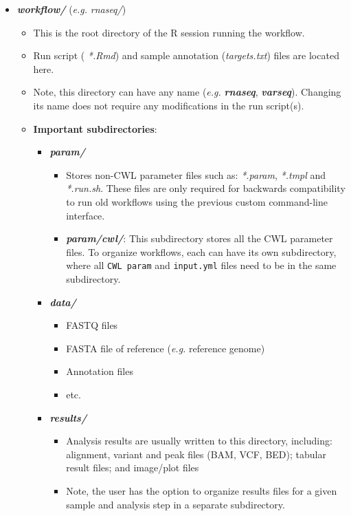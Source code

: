 \documentclass[14pt,]{article}
\providecommand{\tightlist}{%
  \setlength{\itemsep}{0pt}\setlength{\parskip}{0pt}}
\begin{document}
\begin{itemize}
\tightlist
\item
  {\emph{\textbf{workflow/}}} (\emph{e.g.} \emph{rnaseq/})

  \begin{itemize}
  \tightlist
  \item
    This is the root directory of the R session running the workflow.
  \item
    Run script ( \emph{*.Rmd}) and sample annotation (\emph{targets.txt}) files are located here.
  \item
    Note, this directory can have any name (\emph{e.g.} {\emph{\textbf{rnaseq}}}, {\emph{\textbf{varseq}}}). Changing its name does not require any modifications in the run script(s).
  \item
    \textbf{Important subdirectories}:

    \begin{itemize}
    \tightlist
    \item
      {\emph{\textbf{param/}}}

      \begin{itemize}
      \tightlist
      \item
        Stores non-CWL parameter files such as: \emph{*.param}, \emph{*.tmpl} and \emph{*.run.sh}. These files are only required for backwards compatibility to run old workflows using the previous custom command-line interface.
      \item
        {\emph{\textbf{param/cwl/}}}: This subdirectory stores all the CWL parameter files. To organize workflows, each can have its own subdirectory, where all \texttt{CWL param} and \texttt{input.yml} files need to be in the same subdirectory.
      \end{itemize}
    \item
      {\emph{\textbf{data/}} }

      \begin{itemize}
      \tightlist
      \item
        FASTQ files
      \item
        FASTA file of reference (\emph{e.g.} reference genome)
      \item
        Annotation files
      \item
        etc.
      \end{itemize}
    \item
      {\emph{\textbf{results/}}}

      \begin{itemize}
      \tightlist
      \item
        Analysis results are usually written to this directory, including: alignment, variant and peak files (BAM, VCF, BED); tabular result files; and image/plot files
      \item
        Note, the user has the option to organize results files for a given sample and analysis step in a separate subdirectory.
      \end{itemize}
    \end{itemize}
  \end{itemize}
\end{itemize}
\end{document}
